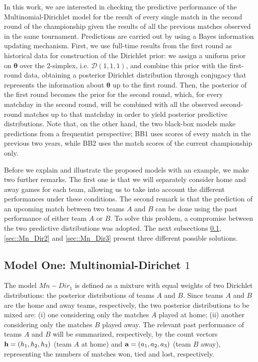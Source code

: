 \documentclass[journal,article,accept,moreauthors,pdftex,12pt,a4paper]{mdpi}
\begin{document}
        In this work, we are interested in checking the predictive performance of the Multinomial-Dirichlet
        model for the result of every single match in the second round of the championship given the results
        of all the previous matches observed in the same tournament. Predictions
        are carried out by using a Bayes information updating mechanism. First, we use full-time
        results from the first round as historical data for construction of the Dirichlet prior: we assign a uniform prior on
        $\boldsymbol{\theta}$ over the 2-simplex, i.e. $\mathcal{D}(1, 1, 1)$, and combine this prior with
        the first-round data, obtaining a posterior Dirichlet distribution through conjugacy that represents
        the information about $\boldsymbol{\theta}$ up to the first round. Then, the posterior of the first
        round becomes the prior for the second round, which, for every matchday in the second round, will be combined with all the observed second-round matches
        up to that matchday in order to yield posterior predictive distributions. Note that, on the other hand, the two
        black-box models make predictions from a frequentist perspective; BB1 uses scores of every match
        in the previous two years, while BB2 uses the match scores of the current championship only.

        Before we explain and illustrate the proposed models with an example, we make two further remarks.
        The first one is that we will separately consider home and away games for each team, allowing us to take into account the different performances under these conditions.
        The second remark is that the prediction of an upcoming match between two teams $A$ and $B$ can be done using
        the past performance of either team $A$ or $B$.
        To solve this problem, a compromise between the two predictive distributions was adopted.
        The next subsections \ref{sec::Mn_Dir1}, \ref{sec::Mn_Dir2} and \ref{sec::Mn_Dir3} present three different possible solutions.

    \subsection{Model One: Multinomial-Dirichet $1$}
    \label{sec::Mn_Dir1}

    The model $Mn-Dir_1$ is defined as a mixture with equal weights of two Dirichlet distributions: the posterior distributions of teams $A$ and $B$.
    Since teams $A$ and $B$ are the home and away teams, respectively, the two posterior distributions to be mixed are: (i) one considering only the matches $A$ played at home; (ii) another considering only the matches $B$ played away.
    The relevant past performance of teams $A$ and $B$ will be summarized, respectively, by the count vectors ${\bf h} = (h_1, h_2, h_3)$ (team $A$ at home) and ${\bf a} = (a_1, a_2, a_3)$ (team $B$ away), representing the numbers of matches won, tied and lost, respectively.
\end{document}
